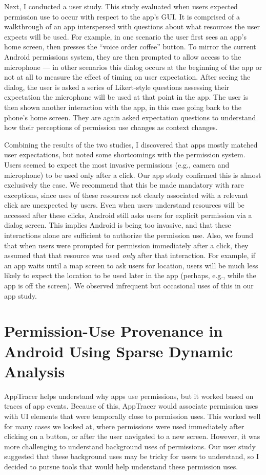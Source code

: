 Next, I conducted a user study. This study evaluated when users
expected permission use to occur with respect to the app's GUI. It is
comprised of a walkthrough of an app interspersed with questions about
what resources the user expects will be used.  For example, in one
scenario the user first sees an app's home screen, then presses the
``voice order coffee'' button. To mirror the current Android
permissions system, they are then prompted to allow access to the
microphone --- in other scenarios this dialog occurs at the beginning
of the app or not at all to measure the effect of timing on user
expectation. After seeing the dialog, the user is asked a series of
Likert-style questions assessing their expectation the microphone will
be used at that point in the app. The user is then shown another
interaction with the app, in this case going back to the phone's home
screen. They are again asked expectation questions to understand how
their perceptions of permission use changes as context changes.

Combining the results of the two studies, I discovered that apps
mostly matched user expectations, but noted some shortcomings with the
permission system. Users seemed to expect the most invasive
permissions (e.g., camera and microphone) to be used only after a
click. Our app study confirmed this is almost exclusively the case. We
recommend that this be made mandatory with rare exceptions, since uses
of these resources not clearly associated with a relevant click are
unexpected by users. Even when users understand resources will be
accessed after these clicks, Android still asks users for explicit
permission via a dialog screen. This implies Android is being too
invasive, and that these interactions alone are sufficient to
authorize the permission use. Also, we found that when users were
prompted for permission immediately after a click, they assumed that
that resource was used \emph{only} after that interaction. For
example, if an app waits until a map screen to ask users for location,
users will be much less likely to expect the location to be used later
in the app (perhaps, e.g., while the app is off the screen). We
observed infrequent but occasional uses of this in our app study.

\section{Permission-Use Provenance in Android Using Sparse Dynamic Analysis}

AppTracer helps understand why apps use permissions, but it worked
based on traces of app events. Because of this, AppTracer would
associate permission uses with UI elements that were temporally close
to permission uses. This worked well for many cases we looked at,
where permissions were used immediately after clicking on a button, or
after the user navigated to a new screen. However, it was more
challenging to understand background uses of permissions. Our user
study suggested that these background uses may be tricky for users to
understand, so I decided to pursue tools that would help understand
these permission uses. 

